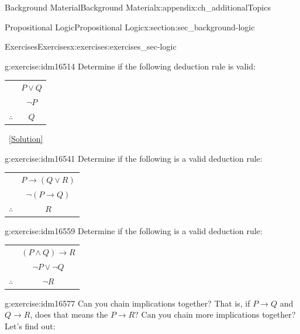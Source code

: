 \documentclass[oneside,10pt,]{book}
\numberwithin{equation}{chapter}
\newcommand{\hrulethin}  {\noalign{\hrule height 0.04em}}
\def\imp{\rightarrow}
\begin{document}
\begin{appendixptx}{Background Material}{}{Background Material}{}{}{x:appendix:ch_additionalTopics}
\begin{sectionptx}{Propositional Logic}{}{Propositional Logic}{}{}{x:section:sec_background-logic}
\begin{exercises-subsection}{Exercises}{}{Exercises}{}{}{x:exercises:exercises_sec-logic}
\begin{divisionexercise}{10}{}{}{g:exercise:idm16514}%
Determine if the following deduction rule is valid:%
\begin{sidebyside}{1}{0}{0}{0}%
\begin{sbspanel}{1}%
{\centering%
\begin{tabular}{cc}
&\(P \vee Q\)\tabularnewline[0pt]
&\(\neg P\)\tabularnewline\hrulethin
\(\therefore\)&\(Q\)
\end{tabular}
\par}
\end{sbspanel}%
\end{sidebyside}%
\qquad~\hfill{\tiny\hyperlink{g:solution:idm16532-main}{[Solution]}}\end{divisionexercise}%
\begin{divisionexercise}{11}{}{}{g:exercise:idm16541}%
Determine if the following is a valid deduction rule:%
\begin{sidebyside}{1}{0}{0}{0}%
\begin{sbspanel}{1}%
{\centering%
\begin{tabular}{cc}
&\(P \imp (Q \vee R)\)\tabularnewline[0pt]
&\(\neg(P \imp Q)\)\tabularnewline\hrulethin
\(\therefore\)&\(R\)
\end{tabular}
\par}
\end{sbspanel}%
\end{sidebyside}%
\end{divisionexercise}%
\begin{divisionexercise}{12}{}{}{g:exercise:idm16559}%
Determine if the following is a valid deduction rule:%
\begin{sidebyside}{1}{0}{0}{0}%
\begin{sbspanel}{1}%
{\centering%
\begin{tabular}{cc}
&\((P \wedge Q) \imp R\)\tabularnewline[0pt]
&\(\neg P \vee \neg Q\)\tabularnewline\hrulethin
\(\therefore\)&\(\neg R\)
\end{tabular}
\par}
\end{sbspanel}%
\end{sidebyside}%
\end{divisionexercise}%
\begin{divisionexercise}{13}{}{}{g:exercise:idm16577}%
Can you chain implications together? That is, if \(P \imp Q\) and \(Q \imp R\), does that means the \(P \imp R\)? Can you chain more implications together? Let's find out:%
\par

\end{divisionexercise}
\end{exercises-subsection}
\end{sectionptx}
\end{appendixptx}
\end{document}
